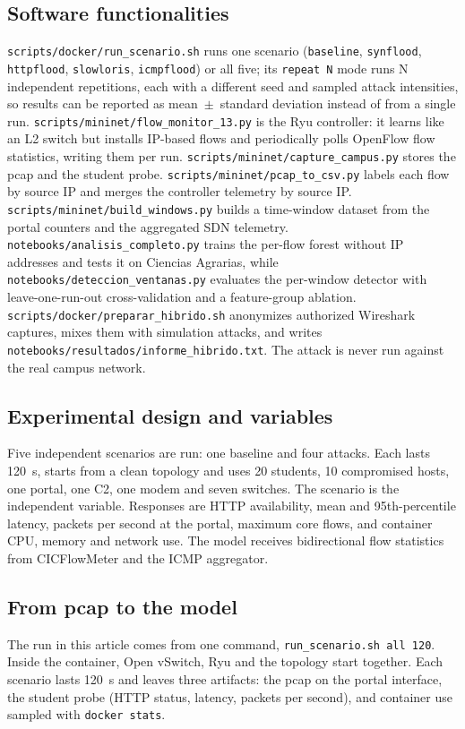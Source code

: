 \documentclass[journal,article,submit,moreauthors]{Definitions/mdpi}
\begin{document}
\subsection{Software functionalities}
\texttt{scripts/docker/run\_scenario.sh} runs one scenario (\texttt{baseline}, \texttt{synflood}, \texttt{httpflood}, \texttt{slowloris}, \texttt{icmpflood}) or all five; its \texttt{repeat N} mode runs N independent repetitions, each with a different seed and sampled attack intensities, so results can be reported as mean~$\pm$~standard deviation instead of from a single run. \texttt{scripts/mininet/flow\_monitor\_13.py} is the Ryu controller: it learns like an L2 switch but installs IP-based flows and periodically polls OpenFlow flow statistics, writing them per run. \texttt{scripts/mininet/capture\_campus.py} stores the pcap and the student probe. \texttt{scripts/mininet/pcap\_to\_csv.py} labels each flow by source IP and merges the controller telemetry by source IP. \texttt{scripts/mininet/build\_windows.py} builds a time-window dataset from the portal counters and the aggregated SDN telemetry. \texttt{notebooks/analisis\_completo.py} trains the per-flow forest without IP addresses and tests it on Ciencias Agrarias, while \texttt{notebooks/deteccion\_ventanas.py} evaluates the per-window detector with leave-one-run-out cross-validation and a feature-group ablation. \texttt{scripts/docker/preparar\_hibrido.sh} anonymizes authorized Wireshark captures, mixes them with simulation attacks, and writes \texttt{notebooks/resultados/informe\_hibrido.txt}. The attack is never run against the real campus network.

\subsection{Experimental design and variables}
Five independent scenarios are run: one baseline and four attacks. Each lasts 120~s, starts from a clean topology and uses 20 students, 10 compromised hosts, one portal, one C2, one modem and seven switches. The scenario is the independent variable. Responses are HTTP availability, mean and 95th-percentile latency, packets per second at the portal, maximum core flows, and container CPU, memory and network use. The model receives bidirectional flow statistics from CICFlowMeter and the ICMP aggregator.

\subsection{From pcap to the model}
The run in this article comes from one command, \texttt{run\_scenario.sh all 120}. Inside the container, Open vSwitch, Ryu and the topology start together. Each scenario lasts 120~s and leaves three artifacts: the pcap on the portal interface, the student probe (HTTP status, latency, packets per second), and container use sampled with \texttt{docker stats}.
\end{document}
